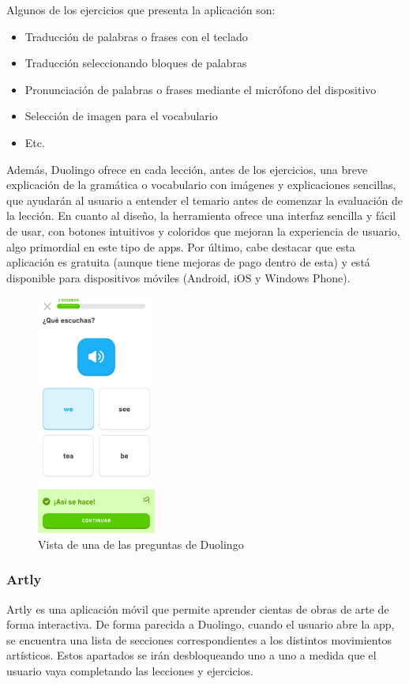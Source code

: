 Algunos de los ejercicios que presenta la aplicación son:
\begin{itemize}
    \item Traducción de palabras o frases con el teclado
    \item Traducción seleccionando bloques de palabras
    \item Pronunciación de palabras o frases mediante el micrófono del dispositivo
    \item Selección de imagen para el vocabulario
    \item Etc.
\end {itemize}
    Además, Duolingo ofrece en cada lección, antes de los ejercicios, una breve explicación de la gramática o vocabulario con
imágenes y explicaciones sencillas, que ayudarán al usuario a entender el temario antes de comenzar la evaluación de la lección.
En cuanto al diseño, la herramienta ofrece una interfaz sencilla y fácil de usar, con botones intuitivos y coloridos que mejoran
la experiencia de usuario, algo primordial en este tipo de apps.
Por último, cabe destacar que esta aplicación es gratuita (aunque tiene mejoras de pago dentro de esta) y está disponible para dispositivos móviles (Android, iOS y Windows Phone).
\begin{figure}[H]
    \centering
    \includegraphics[width=0.35\textwidth]{imagenes/c2/duolingo.jpeg}
    \caption{Vista de una de las preguntas de Duolingo}
\end{figure} 


\subsubsection{Artly}
Artly es una aplicación móvil que permite aprender cientas de obras de arte de forma interactiva. De forma parecida a Duolingo, 
cuando el usuario abre la app, se encuentra una lista de secciones correspondientes a los distintos movimientos 
artísticos. Estos apartados se irán desbloqueando uno a uno a medida que el usuario vaya completando las lecciones y ejercicios.
 
